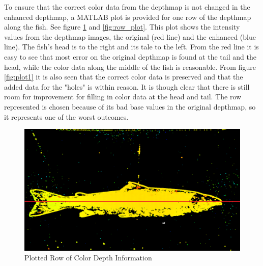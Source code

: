 To ensure that the correct color data from the depthmap is not changed in the enhanced depthmap, a MATLAB plot is provided for one row of the depthmap along the fish. See figure \ref{fig:sectional} and \ref{fig:row_plot}. This plot shows the intensity values from the depthmap images, the original (red line) and the enhanced (blue line). The fish's head is to the right and its tale to the left. From the red line it is easy to see that most error on the original depthmap is found at the tail and the head, while the color data along the middle of the fish is reasonable. From figure \ref{fig:plot1} it is also seen that the correct color data is preserved and that the added data for the "holes" is within reason. It is though clear that there is still room for improvement for filling in color data at the head and tail. 
The row represented is chosen because of its bad base values in the original depthmap, so it represents one of the worst outcomes.


\begin{figure}[H]
    \centering
    \includegraphics[width=.7\linewidth]{images/results/sectional}
    \caption{Plotted Row of Color Depth Information}
    \label{fig:sectional}
\end{figure}


